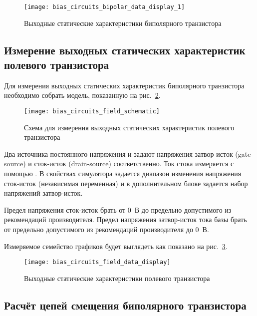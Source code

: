 \begin{figure}[!ht]
    \centering
    \texttt{[image: bias\_circuits\_bipolar\_data\_display\_1]}
    \caption{Выходные статические характеристики биполярного транзистора}%
    \label{fig:bias_circuits_bipolar_data_display_1}
\end{figure}

\subsection{Измерение выходных статических характеристик полевого транзистора}

Для измерения выходных статических характеристик биполярного транзистора необходимо собрать модель, показанную на рис.~\ref{fig:bias_circuits_field_schematic}.

\begin{figure}[!ht]
    \centering
    \texttt{[image: bias\_circuits\_field\_schematic]}
    \caption{Схема для измерения выходных статических характеристик полевого транзистора}%
    \label{fig:bias_circuits_field_schematic}
\end{figure}

Два источника постоянного напряжения  и  задают напряжения затвор-исток (gate-source) и сток-исток (drain-source) соответственно.
Ток стока измеряется с помощью . В свойствах симулятора  задается диапазон изменения напряжения сток-исток (независимая переменная) и в дополнительном блоке  задается набор напряжений затвор-исток.

Предел напряжения сток-исток брать от 0~В до предельно допустимого из рекомендаций производителя. Предел напряжения затвор-исток тока базы брать от предельно допустимого из рекомендаций производителя до 0~В.

Измеряемое семейство графиков будет выглядеть как показано на рис.~\ref{fig:bias_circuits_field_data_display}.

\begin{figure}[!ht]
    \centering
    \texttt{[image: bias\_circuits\_field\_data\_display]}
    \caption{Выходные статические характеристики полевого транзистора}%
    \label{fig:bias_circuits_field_data_display}
\end{figure}
\subsection{Расчёт цепей смещения биполярного транзистора}

